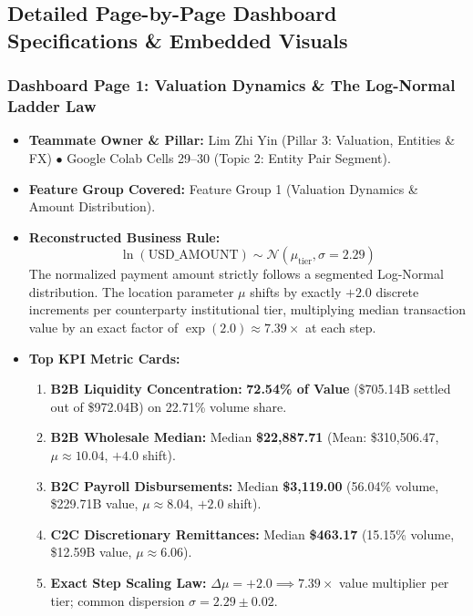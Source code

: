 \documentclass[11pt,a4paper]{article}
\begin{document}
\subsection{Detailed Page-by-Page Dashboard Specifications \& Embedded Visuals}

\subsubsection{Dashboard Page 1: Valuation Dynamics \& The Log-Normal Ladder Law}
\begin{itemize}
    \item \textbf{Teammate Owner \& Pillar:} Lim Zhi Yin (Pillar 3: Valuation, Entities \& FX) $\bullet$ Google Colab Cells 29--30 (Topic 2: Entity Pair Segment).
    \item \textbf{Feature Group Covered:} Feature Group 1 (Valuation Dynamics \& Amount Distribution).
    \item \textbf{Reconstructed Business Rule:}
    \begin{equation}
    \ln(\text{USD\_AMOUNT}) \sim \mathcal{N}(\mu_{\text{tier}}, \sigma = 2.29)
    \end{equation}
    The normalized payment amount strictly follows a segmented Log-Normal distribution. The location parameter $\mu$ shifts by exactly $+2.0$ discrete increments per counterparty institutional tier, multiplying median transaction value by an exact factor of $\exp(2.0) \approx 7.39\times$ at each step.
    \item \textbf{Top KPI Metric Cards:}
    \begin{enumerate}
        \item \textbf{B2B Liquidity Concentration:} \textbf{72.54\% of Value} (\$705.14B settled out of \$972.04B) on 22.71\% volume share.
        \item \textbf{B2B Wholesale Median:} Median \textbf{\$22,887.71} (Mean: \$310,506.47, $\mu \approx 10.04$, $+4.0$ shift).
        \item \textbf{B2C Payroll Disbursements:} Median \textbf{\$3,119.00} (56.04\% volume, \$229.71B value, $\mu \approx 8.04$, $+2.0$ shift).
        \item \textbf{C2C Discretionary Remittances:} Median \textbf{\$463.17} (15.15\% volume, \$12.59B value, $\mu \approx 6.06$).
        \item \textbf{Exact Step Scaling Law:} $\Delta \mu = +2.0 \implies 7.39\times$ value multiplier per tier; common dispersion $\sigma = 2.29 \pm 0.02$.
    \end{enumerate}

\end{itemize}
\end{document}
